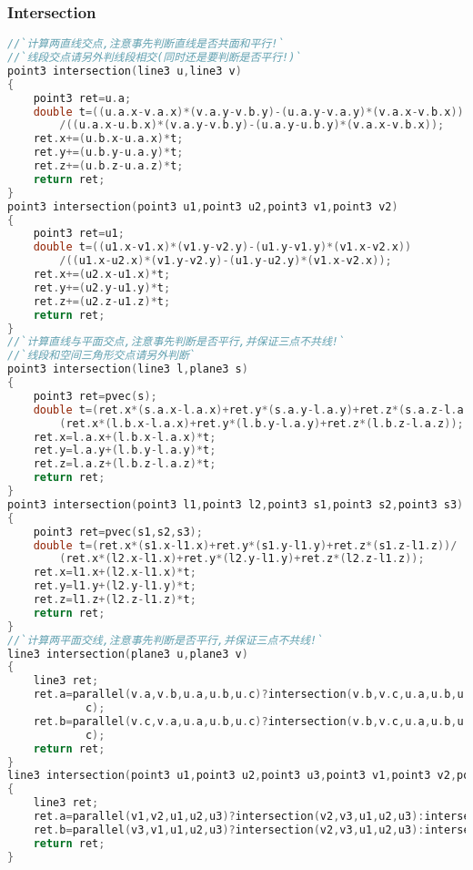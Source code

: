 \subsubsection{Intersection}
\begin{lstlisting}[language=C++]
//`计算两直线交点,注意事先判断直线是否共面和平行!`
//`线段交点请另外判线段相交(同时还是要判断是否平行!)`
point3 intersection(line3 u,line3 v)
{
    point3 ret=u.a;
    double t=((u.a.x-v.a.x)*(v.a.y-v.b.y)-(u.a.y-v.a.y)*(v.a.x-v.b.x))
        /((u.a.x-u.b.x)*(v.a.y-v.b.y)-(u.a.y-u.b.y)*(v.a.x-v.b.x));
    ret.x+=(u.b.x-u.a.x)*t;
    ret.y+=(u.b.y-u.a.y)*t;
    ret.z+=(u.b.z-u.a.z)*t;
    return ret;
}
point3 intersection(point3 u1,point3 u2,point3 v1,point3 v2)
{
    point3 ret=u1;
    double t=((u1.x-v1.x)*(v1.y-v2.y)-(u1.y-v1.y)*(v1.x-v2.x))
        /((u1.x-u2.x)*(v1.y-v2.y)-(u1.y-u2.y)*(v1.x-v2.x));
    ret.x+=(u2.x-u1.x)*t;
    ret.y+=(u2.y-u1.y)*t;
    ret.z+=(u2.z-u1.z)*t;
    return ret;
}
//`计算直线与平面交点,注意事先判断是否平行,并保证三点不共线!`
//`线段和空间三角形交点请另外判断`
point3 intersection(line3 l,plane3 s)
{
    point3 ret=pvec(s);
    double t=(ret.x*(s.a.x-l.a.x)+ret.y*(s.a.y-l.a.y)+ret.z*(s.a.z-l.a.z))/
        (ret.x*(l.b.x-l.a.x)+ret.y*(l.b.y-l.a.y)+ret.z*(l.b.z-l.a.z));
    ret.x=l.a.x+(l.b.x-l.a.x)*t;
    ret.y=l.a.y+(l.b.y-l.a.y)*t;
    ret.z=l.a.z+(l.b.z-l.a.z)*t;
    return ret;
}
point3 intersection(point3 l1,point3 l2,point3 s1,point3 s2,point3 s3)
{
    point3 ret=pvec(s1,s2,s3);
    double t=(ret.x*(s1.x-l1.x)+ret.y*(s1.y-l1.y)+ret.z*(s1.z-l1.z))/
        (ret.x*(l2.x-l1.x)+ret.y*(l2.y-l1.y)+ret.z*(l2.z-l1.z));
    ret.x=l1.x+(l2.x-l1.x)*t;
    ret.y=l1.y+(l2.y-l1.y)*t;
    ret.z=l1.z+(l2.z-l1.z)*t;
    return ret;
}
//`计算两平面交线,注意事先判断是否平行,并保证三点不共线!`
line3 intersection(plane3 u,plane3 v)
{
    line3 ret;
    ret.a=parallel(v.a,v.b,u.a,u.b,u.c)?intersection(v.b,v.c,u.a,u.b,u.c):intersection(v.a,v.b,u.a,u.b,u.
            c);
    ret.b=parallel(v.c,v.a,u.a,u.b,u.c)?intersection(v.b,v.c,u.a,u.b,u.c):intersection(v.c,v.a,u.a,u.b,u.
            c);
    return ret;
}
line3 intersection(point3 u1,point3 u2,point3 u3,point3 v1,point3 v2,point3 v3)
{
    line3 ret;
    ret.a=parallel(v1,v2,u1,u2,u3)?intersection(v2,v3,u1,u2,u3):intersection(v1,v2,u1,u2,u3);
    ret.b=parallel(v3,v1,u1,u2,u3)?intersection(v2,v3,u1,u2,u3):intersection(v3,v1,u1,u2,u3);
    return ret;
}
\end{lstlisting}
